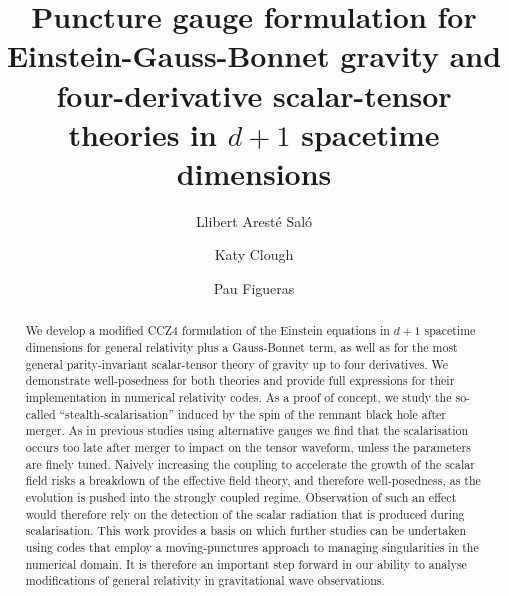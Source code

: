 \documentclass[reprint,aps,amsmath,amssymb,twoside,prd,showkeys,superscriptaddress,nofootinbib]{revtex4-2}
\begin{document}
\title{Puncture gauge formulation for Einstein-Gauss-Bonnet gravity and four-derivative scalar-tensor theories in $d+1$ spacetime dimensions}

\author{Llibert Arest\'e Sal\'o}

\author{Katy Clough}

\author{Pau Figueras}

\begin{abstract}
We develop a modified CCZ4 formulation of the Einstein equations in $d+1$ spacetime dimensions for general relativity plus a Gauss-Bonnet term, as well as for the most general parity-invariant scalar-tensor theory of gravity up to four derivatives. We demonstrate well-posedness for both theories and provide full expressions for their implementation in numerical relativity codes. As a proof of concept, we study the so-called ``stealth-scalarisation'' induced by the spin of the remnant black hole after merger. As in previous studies using alternative gauges we find that the scalarisation occurs too late after merger to impact on the tensor waveform, unless the parameters are finely tuned. Naively increasing the coupling to accelerate the growth of the scalar field risks a breakdown of the effective field theory, and therefore well-posedness, as the evolution is pushed into the strongly coupled regime. Observation of such an effect would therefore rely on the detection of the scalar radiation that is produced during scalarisation. This work provides a basis on which further studies can be undertaken using codes that employ a moving-punctures approach to managing singularities in the numerical domain. It is therefore an important step forward in our ability to analyse modifications of general relativity in gravitational wave observations.
\end{abstract}

\maketitle
\thispagestyle{fancy}
\end{document}
